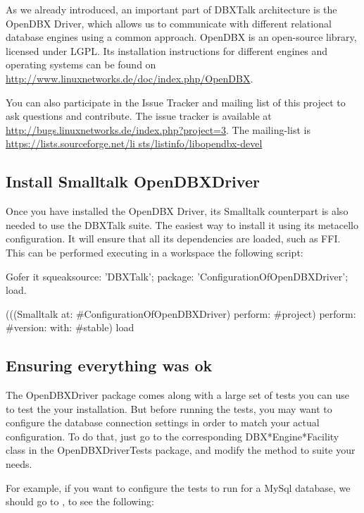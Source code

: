 \documentclass[a4paper,10pt,twoside]{book}
\begin{document}
As we already introduced, an important part of DBXTalk architecture is the OpenDBX Driver, which allows us
to communicate with different relational database engines using a common approach.  OpenDBX is an open-source library,
licensed under LGPL. Its installation instructions for different engines and operating systems can be found on \url{http://www.linuxnetworks.de/doc/index.php/OpenDBX}.


You can also participate in the Issue Tracker and mailing list of this project to ask questions and contribute. The issue tracker is available at \url{http://bugs.linuxnetworks.de/index.php?project=3}. The mailing-list is \url{https://lists.sourceforge.net/li sts/listinfo/libopendbx-devel}

\subsection*{Install Smalltalk OpenDBXDriver}
Once you have installed the OpenDBX Driver, its Smalltalk counterpart is also needed to use the DBXTalk suite.  The easiest way to install it using its metacello configuration. It will ensure that all its dependencies are loaded, such as FFI.  This can be performed executing in a workspace the following script:

\begin{code}{}
Gofer it
	squeaksource: 'DBXTalk';
	package: 'ConfigurationOfOpenDBXDriver';
	load.
	
(((Smalltalk at: #ConfigurationOfOpenDBXDriver) perform: #project) perform: #version: with: #stable) load
\end{code}

\subsection*{Ensuring everything was ok}

The OpenDBXDriver package comes along with a large set of tests you can use to test the your installation.  But before running
 the tests, you may want to configure the database connection settings in order to match your actual configuration.
To do that, just go to the corresponding DBX*Engine*Facility class in the OpenDBXDriverTests package, and modify the
 method to suite your needs.

For example, if you want to configure the tests to run for a MySql database, we should go to , to see the following:
\end{document}
